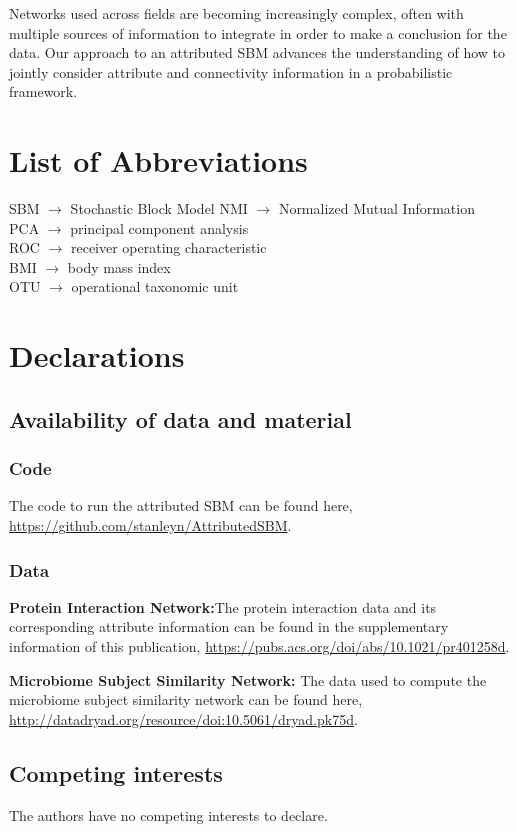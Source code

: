 Networks used across fields are becoming increasingly complex, often with multiple sources of information to integrate in order to make a conclusion for the data. Our approach to an attributed SBM advances the understanding of how to jointly consider attribute and connectivity information in a probabilistic framework. 

\section{List of Abbreviations}
SBM $\rightarrow$ Stochastic Block Model
NMI $\rightarrow$ Normalized Mutual Information\\
PCA $\rightarrow$ principal component analysis\\
ROC $\rightarrow$ receiver operating characteristic \\
BMI $\rightarrow$ body mass index\\
OTU $\rightarrow$ operational taxonomic unit

\section{Declarations}

\subsection{Availability of data and material}

\subsubsection{Code}
The code to run the attributed SBM can be found here, \url{https://github.com/stanleyn/AttributedSBM}.

\subsubsection{Data}
{\bf Protein Interaction Network:}The protein interaction data and its corresponding attribute information can be found in the supplementary information of this publication, \url{https://pubs.acs.org/doi/abs/10.1021/pr401258d}. 

{\bf Microbiome Subject Similarity Network:} The data used to compute the microbiome subject similarity network can be found here, \url{http://datadryad.org/resource/doi:10.5061/dryad.pk75d}. 

\subsection{Competing interests}
The authors have no competing interests to declare. 

